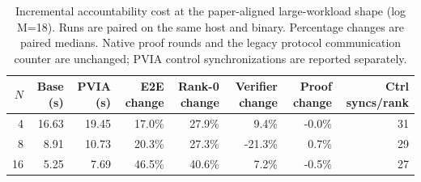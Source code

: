 \begin{table}[t]
\centering
\caption{Incremental accountability cost at the paper-aligned large-workload shape (log M=18). Runs are paired on the same host and binary. Percentage changes are paired medians. Native proof rounds and the legacy protocol communication counter are unchanged; PVIA control synchronizations are reported separately.}
\label{tab:pvia-paper-aligned-tax}
\begin{tabular}{rrrrrrrr}
\toprule
$N$ & Base (s) & PVIA (s) & E2E change & Rank-0 change & Verifier change & Proof change & Ctrl syncs/rank \\
\midrule
4 & 16.63 & 19.45 & 17.0\% & 27.9\% & 9.4\% & -0.0\% & 31 \\
8 & 8.91 & 10.73 & 20.3\% & 27.3\% & -21.3\% & 0.7\% & 29 \\
16 & 5.25 & 7.69 & 46.5\% & 40.6\% & 7.2\% & -0.5\% & 27 \\
\bottomrule
\end{tabular}
\end{table}
